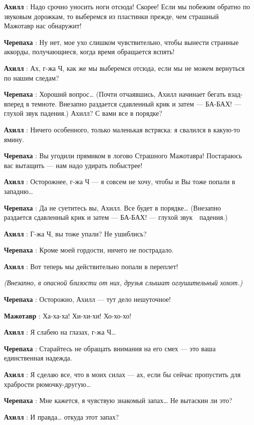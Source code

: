 \textbf{Ахилл} : Надо срочно уносить ноги отсюда! Скорее! Если мы побежим обратно по звуковым дорожкам, то выберемся из пластинки прежде, чем страшный Мажотавр нас обнаружит!

\textbf{Черепаха} : Ну нет, мое ухо слишком чувствительно, чтобы вынести странные аккорды, получающиеся, когда время обращается вспять!

\textbf{Ахилл} : Ах, г-жа Ч, как же мы выберемся отсюда, если мы не можем вернуться по нашим следам?

\textbf{Черепаха} : Хороший вопрос\ldots{} (Почти отчаявшись, Ахилл начинает бегать взад-вперед в темноте. Внезапно раздается сдавленный крик и затем --- БА-БАХ! --- глухой звук падения.) Ахилл? С вами все в порядке?

\textbf{Ахилл} : Ничего особенного, только маленькая встряска: я свалился в какую-то ямину.

\textbf{Черепаха} : Вы угодили прямиком в логово Страшного Мажотавра! Постараюсь вас вытащить --- нам надо удирать побыстрее!

\textbf{Ахилл} : Осторожнее, г-жа Ч --- я совсем не хочу, чтобы и Вы тоже попали в западню\ldots{}

\textbf{Черепаха} : Да не суетитесь вы, Ахилл. Все будет в порядке\ldots{} (Внезапно раздается сдавленный крик и затем --- БА-БАХ! --- глухой звук~~падения.)

\textbf{Ахилл} : Г-жа Ч, вы тоже упали? Не ушиблись?

\textbf{Черепаха} : Кроме моей гордости, ничего не пострадало.

\textbf{Ахилл} : Вот теперь мы действительно попали в переплет!

\emph{(Внезапно, в опасной близости от них, друзья слышат оглушительный хохот.)}

\textbf{Черепаха} : Осторожно, Ахилл --- тут дело нешуточное!

\textbf{Мажотавр} : Ха-ха-ха! Хи-хи-хи! Хо-хо-хо!

\textbf{Ахилл} : Я слабею на глазах, г-жа Ч\ldots{}

\textbf{Черепаха} : Старайтесь не обращать внимания на его смех --- это ваша единственная надежда.

\textbf{Ахилл} : Я сделаю все, что в моих силах --- ах, если бы сейчас пропустить для храбрости рюмочку-другую\ldots{}

\textbf{Черепаха} : Мне кажется, я чувствую знакомый запах\ldots{} Не вытаскин ли это?

\textbf{Ахилл} : И правда\ldots{} откуда этот запах?

